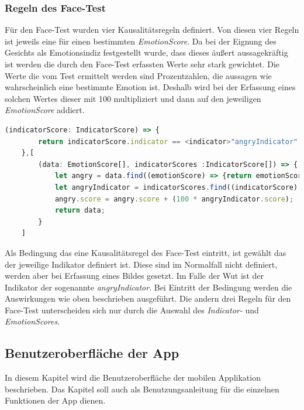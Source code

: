 \subsubsection{Regeln des Face-Test}
Für den Face-Test wurden vier Kausalitätsregeln definiert. Von diesen vier Regeln ist jeweils eine für einen bestimmten \textit{EmotionScore}. Da bei der Eignung des Gesichts als Emotionsindiz festgestellt wurde, dass dieses äußert aussagekräftig ist werden die durch den Face-Test erfassten Werte sehr stark gewichtet. Die Werte die vom Test ermittelt werden sind Prozentzahlen, die aussagen wie wahrscheinlich eine bestimmte Emotion ist. Deshalb wird bei der Erfassung eines solchen Wertes dieser mit 100 multipliziert und dann auf den jeweiligen \textit{EmotionScore} addiert. \newline
\begin{lstlisting}[caption={Kausalitätsregel basierend auf Face-Test für Emotion Wut}, language=JavaScript]
	(indicatorScore: IndicatorScore) => {
		return indicatorScore.indicator == <indicator>"angryIndicator" && indicatorScore.score != undefined;    
	},[
		(data: EmotionScore[], indicatorScores :IndicatorScore[]) => {
			let angry = data.find((emotionScore) => {return emotionScore.emotion == <emotion>"angry"});
			let angryIndicator = indicatorScores.find((indicatorScore) => {return indicatorScore.indicator == <indicator>"angryIndicator"});
			angry.score = angry.score + (100 * angryIndicator.score);
			return data;
		}
	]
\end{lstlisting}
Als Bedingung das eine Kausalitätsregel des Face-Test eintritt, ist gewählt das der jeweilige Indikator definiert ist. Diese sind im Normalfall nicht definiert, werden aber bei Erfassung eines Bildes gesetzt. Im Falle der Wut ist der Indikator der sogenannte \textit{angryIndicator}. Bei Eintritt der Bedingung werden die Auswirkungen wie oben beschrieben ausgeführt. Die andern drei Regeln für den Face-Test unterscheiden sich nur durch die Auswahl des \textit{Indicator-} und \textit{EmotionScores}. \newline 
\subsection{Benutzeroberfläche der App}
In diesem Kapitel wird die Benutzeroberfläche der mobilen Applikation beschrieben. Das Kapitel soll auch als Benutzungsanleitung für die einzelnen Funktionen der App dienen.
